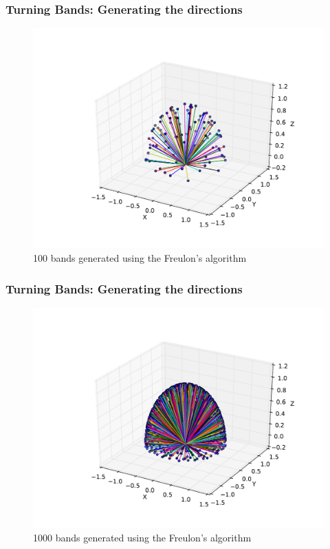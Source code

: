 \begin{frame}
\frametitle{Turning Bands: Generating the directions}
\begin{figure}
\begin{center}
\includegraphics[height=0.7\textheight]{figs/freulon_algo_100_bands.pdf}
\end{center}
\caption{100 bands generated using the Freulon's algorithm}
\label{fig:freulon_algo_100_bands}
\end{figure}
\end{frame}


\begin{frame}
\frametitle{Turning Bands: Generating the directions}
\begin{figure}
\begin{center}
\includegraphics[height=0.7\textheight]{figs/freulon_algo_1000_bands.pdf}
\end{center}
\caption{1000 bands generated using the Freulon's algorithm}
\label{fig:freulon_algo_1000_bands}
\end{figure}
\end{frame}


